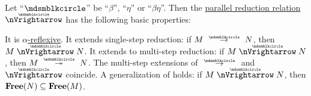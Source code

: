 \begin{proposition}\label{thm:def:parallel_reduction}
  Let \enquote{\( {\Anon} \)} be \enquote{\( \beta \)}, \enquote{\( \eta \)} or \enquote{\( \beta\eta \)}. Then the \hyperref[def:parallel_reduction]{parallel reduction relation} \( {\ppred} \) has the following basic properties:
  \begin{thmenum}
     It is \hyperref[def:alpha_reflexive]{\( \alpha \)-reflexive}.
     It extends single-step reduction: if \( M \pred N \), then \( M \ppred N \).
     It extends to multi-step reduction: if \( M \ppred N \), then \( M \pred* N \).
     The multi-step extensions of \( {\pred} \) and \( {\ppred} \) coincide.
     A generalization of  holds: if \( M \ppred N \), then \( \op*{Free}(N) \subseteq \op*{Free}(M) \).
  \end{thmenum}
\end{proposition}
